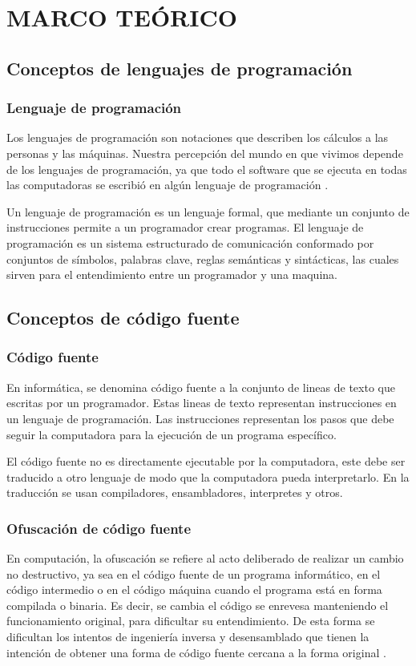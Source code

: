 \chapter{MARCO TEÓRICO}

\section{Conceptos de lenguajes de programación}
\subsection{Lenguaje de programación}
Los lenguajes de programación son notaciones que describen los cálculos a las personas y las máquinas. Nuestra percepción del mundo en que vivimos depende de los lenguajes de programación, ya que todo el software que se ejecuta en todas las computadoras se escribió en algún lenguaje de programación \cite{aho2008compiladores}.

Un lenguaje de programación es un lenguaje formal, que mediante un conjunto de instrucciones permite a un programador crear programas. El lenguaje de programación es un sistema estructurado de comunicación conformado por conjuntos de símbolos, palabras clave, reglas semánticas y sintácticas, las cuales sirven para el entendimiento entre un programador y una maquina.


\section{Conceptos de código fuente}
\subsection{Código fuente}
En informática, se denomina código fuente a la conjunto de lineas de texto que escritas por un programador. Estas lineas de texto representan instrucciones en un lenguaje de programación. Las instrucciones representan los pasos que debe seguir la computadora para la ejecución de un programa específico.

El código fuente no es directamente ejecutable por la computadora, este debe ser traducido a otro lenguaje de modo que la computadora pueda interpretarlo. En la traducción se usan compiladores, ensambladores, interpretes y otros.

\subsection{Ofuscación de código fuente}
En computación, la ofuscación se refiere al acto deliberado de realizar un cambio no destructivo, ya sea en el código fuente de un programa informático, en el código intermedio o en el código máquina cuando el programa está en forma compilada o binaria. Es decir, se cambia el código se enrevesa manteniendo el funcionamiento original, para dificultar su entendimiento. De esta forma se dificultan los intentos de ingeniería inversa y desensamblado que tienen la intención de obtener una forma de código fuente cercana a la forma original \cite{wiki:Obfuscation_(software)}.

